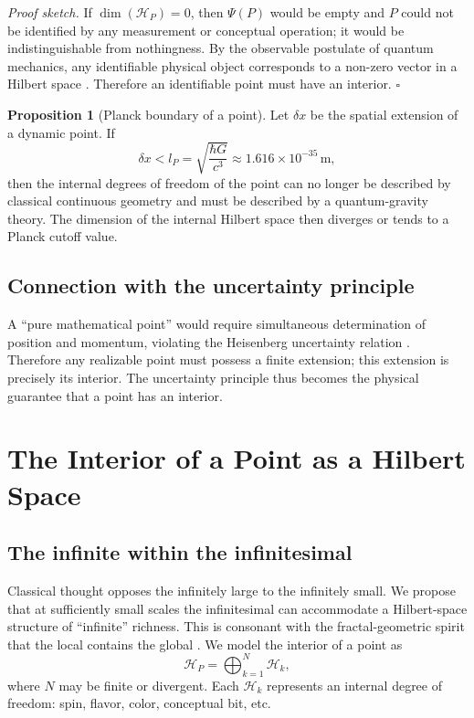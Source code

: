\documentclass[11pt,a4paper]{article}
\theoremstyle{definition}
\newtheorem{proposition}{Proposition}
\begin{document}
\noindent\textit{Proof sketch.} If $\dim(\mathcal{H}_P)=0$, then $\Psi(P)$ would be empty and $P$ could not be identified by any measurement or conceptual operation; it would be indistinguishable from nothingness. By the observable postulate of quantum mechanics, any identifiable physical object corresponds to a non-zero vector in a Hilbert space \cite{von_neumann1955}. Therefore an identifiable point must have an interior. \hfill$\square$

\begin{proposition}[Planck boundary of a point]
Let $\delta x$ be the spatial extension of a dynamic point. If
\begin{equation}
\delta x < l_P = \sqrt{\frac{\hbar G}{c^3}} \approx 1.616 \times 10^{-35}\,\text{m},
\end{equation}
then the internal degrees of freedom of the point can no longer be described by classical continuous geometry and must be described by a quantum-gravity theory. The dimension of the internal Hilbert space then diverges or tends to a Planck cutoff value.
\end{proposition}

\subsection{Connection with the uncertainty principle}

A ``pure mathematical point'' would require simultaneous determination of position and momentum, violating the Heisenberg uncertainty relation \cite{heisenberg1927}. Therefore any realizable point must possess a finite extension; this extension is precisely its interior. The uncertainty principle thus becomes the physical guarantee that a point has an interior.

\section{The Interior of a Point as a Hilbert Space}

\subsection{The infinite within the infinitesimal}

Classical thought opposes the infinitely large to the infinitely small. We propose that at sufficiently small scales the infinitesimal can accommodate a Hilbert-space structure of ``infinite'' richness. This is consonant with the fractal-geometric spirit that the local contains the global \cite{mandelbrot1982}. We model the interior of a point as
\begin{equation}
\mathcal{H}_P = \bigoplus_{k=1}^{N} \mathcal{H}_k,
\end{equation}
where $N$ may be finite or divergent. Each $\mathcal{H}_k$ represents an internal degree of freedom: spin, flavor, color, conceptual bit, etc.
\end{document}
